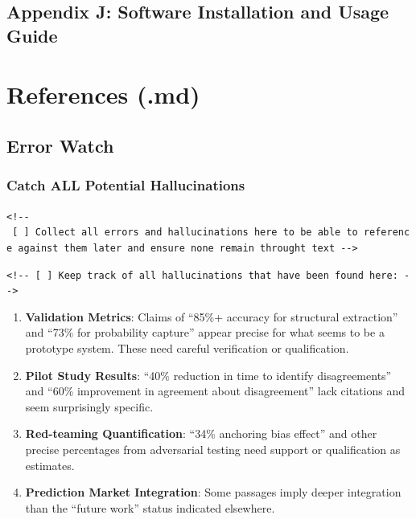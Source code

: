 \documentclass[
  11pt,
  letterpaper,
]{book}
\begin{document}
\section*{Appendix J: Software Installation and Usage
Guide}\label{sec-appendix-software}



\chapter{References (.md)}\label{references-.md}

\section{Error Watch}\label{error-watch}

\subsection{Catch ALL Potential
Hallucinations}\label{catch-all-potential-hallucinations}

\texttt{\textless{}!-\/-\ {[}\ {]}\ Collect\ all\ errors\ and\ hallucinations\ here\ to\ be\ able\ to\ reference\ against\ them\ later\ and\ ensure\ none\ remain\ throught\ text\ -\/-\textgreater{}}

\texttt{\textless{}!-\/-\ {[}\ {]}\ Keep\ track\ of\ all\ hallucinations\ that\ have\ been\ found\ here:\ -\/-\textgreater{}}

\begin{enumerate}
\def\labelenumi{\arabic{enumi}.}
\item
  \textbf{Validation Metrics}: Claims of ``85\%+ accuracy for structural
  extraction'' and ``73\% for probability capture'' appear precise for
  what seems to be a prototype system. These need careful verification
  or qualification.
\item
  \textbf{Pilot Study Results}: ``40\% reduction in time to identify
  disagreements'' and ``60\% improvement in agreement about
  disagreement'' lack citations and seem surprisingly specific.
\item
  \textbf{Red-teaming Quantification}: ``34\% anchoring bias effect''
  and other precise percentages from adversarial testing need support or
  qualification as estimates.
\item
  \textbf{Prediction Market Integration}: Some passages imply deeper
  integration than the ``future work'' status indicated elsewhere.
\end{enumerate}
\end{document}
